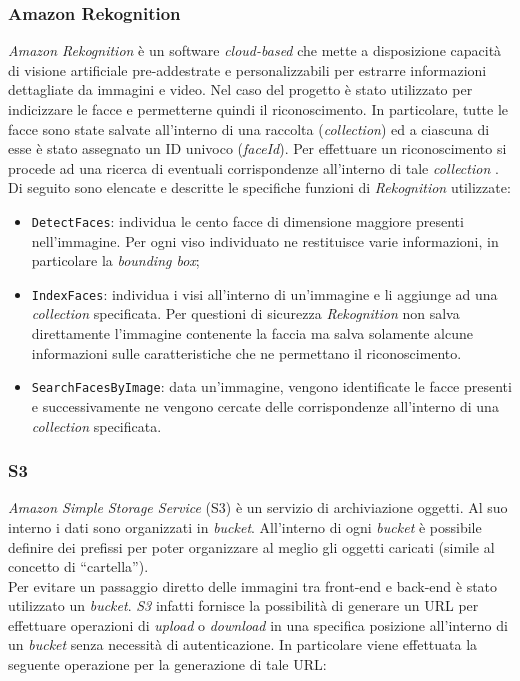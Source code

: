 	\subsubsection{Amazon Rekognition} \label{subsec:rekognition}
	
	\emph{Amazon Rekognition} è un software \emph{cloud-based} che mette a disposizione capacità di visione artificiale pre-addestrate e personalizzabili per estrarre informazioni dettagliate da immagini e video. Nel caso del progetto è stato utilizzato per indicizzare le facce e permetterne quindi il riconoscimento. In particolare, tutte le facce sono state salvate all'interno di una raccolta (\emph{collection}) ed a ciascuna di esse è stato assegnato un ID univoco (\emph{faceId}). Per effettuare un riconoscimento si procede ad una ricerca di eventuali corrispondenze all'interno di tale \emph{collection} . \\
	Di seguito sono elencate e descritte le specifiche funzioni di \emph{Rekognition} utilizzate:
	\begin{itemize}
		\item \texttt{DetectFaces}: individua le cento facce di dimensione maggiore presenti nell'immagine. Per ogni viso individuato ne restituisce varie informazioni, in particolare la \emph{bounding box};
		\item \texttt{IndexFaces}: individua i visi all'interno di un'immagine e li aggiunge ad una \emph{collection} specificata. Per questioni di sicurezza \emph{Rekognition} non salva direttamente l'immagine contenente la faccia ma salva solamente alcune informazioni sulle caratteristiche che ne permettano il riconoscimento.
		\item \texttt{SearchFacesByImage}: data un'immagine, vengono identificate le facce presenti e successivamente ne vengono cercate delle corrispondenze all'interno di una \emph{collection} specificata.
		
	\end{itemize} 
	
	\subsubsection{S3}
	\emph{Amazon Simple Storage Service} (S3) è un servizio di archiviazione oggetti. Al suo interno i dati sono organizzati in \emph{bucket}. All'interno di ogni \emph{bucket} è possibile definire dei prefissi per poter organizzare al meglio gli oggetti caricati (simile al concetto di ``cartella''). \\ 
	Per evitare un passaggio diretto delle immagini tra front-end e back-end è stato utilizzato un \emph{bucket}. \emph{S3} infatti fornisce la possibilità di generare un URL per effettuare operazioni di \emph{upload} o \emph{download} in una specifica posizione all'interno di un \emph{bucket} senza necessità di autenticazione. In particolare viene effettuata la seguente operazione per la generazione di tale URL:

